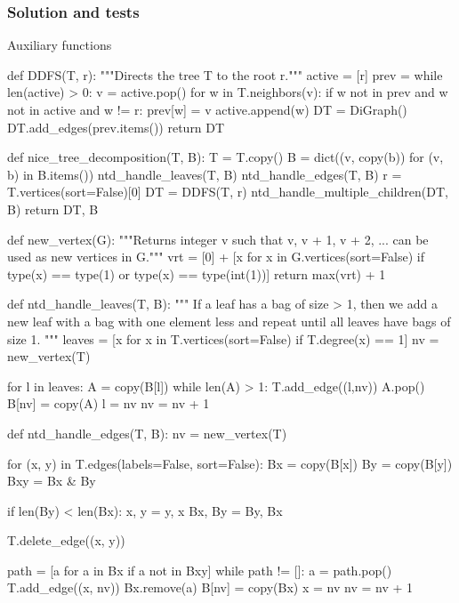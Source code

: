 \subsubsection*{Solution and tests}


Auxiliary functions
\begin{sageCell}
    def DDFS(T, r):
    """Directs the tree T to the root r."""
    active = [r]
    prev = {}
    while len(active) > 0:
        v = active.pop()
        for w in T.neighbors(v):
            if w not in prev and w not in active and w != r:
                prev[w] = v
                active.append(w)
    DT = DiGraph()
    DT.add_edges(prev.items())
    return DT
\end{sageCell}

\begin{sageCell}
def nice_tree_decomposition(T, B):
    T = T.copy()
    B = dict((v, copy(b)) for (v, b) in B.items())
    ntd_handle_leaves(T, B)
    ntd_handle_edges(T, B)
    r = T.vertices(sort=False)[0]
    DT = DDFS(T, r)
    ntd_handle_multiple_children(DT, B)
    return DT, B

def new_vertex(G):
    """Returns integer v such that v, v + 1, v + 2, ... can be used as new vertices in G."""
    vrt = [0] + [x for x in G.vertices(sort=False) if type(x) == type(1) or type(x) == type(int(1))]
    return max(vrt) + 1

def ntd_handle_leaves(T, B):
    """
    If a leaf has a bag of size > 1, then we add a new leaf with a bag with one element less and repeat until all leaves have bags of size 1.
    """
    leaves = [x for x in T.vertices(sort=False) if T.degree(x) == 1]
    nv = new_vertex(T)

    for l in leaves:
        A = copy(B[l])
        while len(A) > 1:
            T.add_edge((l,nv))
            A.pop()
            B[nv] = copy(A)
            l = nv
            nv = nv + 1

def ntd_handle_edges(T, B):
    nv = new_vertex(T)

    for (x, y) in T.edges(labels=False, sort=False):
        Bx = copy(B[x])
        By = copy(B[y])
        Bxy = Bx & By

        if len(By) < len(Bx):
            x, y = y, x
            Bx, By = By, Bx

        T.delete_edge((x, y))

        path = [a for a in Bx if a not in Bxy]
        while path != []:
            a = path.pop()
            T.add_edge((x, nv))
            Bx.remove(a)
            B[nv] = copy(Bx)
            x = nv
            nv = nv + 1


\end{sageCell}

